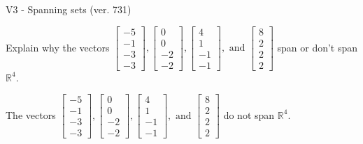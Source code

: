 \begin{exercise}
  \begin{exerciseTitle}V3 - Spanning sets (ver. 731)\end{exerciseTitle}
  \begin{exerciseStatement}
    Explain why the vectors \(\left[\begin{array}{r}
-5 \\
-1 \\
-3 \\
-3
\end{array}\right] , \left[\begin{array}{r}
0 \\
0 \\
-2 \\
-2
\end{array}\right] , \left[\begin{array}{r}
4 \\
1 \\
-1 \\
-1
\end{array}\right] , \text{ and } \left[\begin{array}{r}
8 \\
2 \\
2 \\
2
\end{array}\right]\) span or don't span \(\mathbb{R}^4\). 
	


  \end{exerciseStatement}
  \begin{exerciseAnswer}
   The vectors \(\left[\begin{array}{r}
-5 \\
-1 \\
-3 \\
-3
\end{array}\right] , \left[\begin{array}{r}
0 \\
0 \\
-2 \\
-2
\end{array}\right] , \left[\begin{array}{r}
4 \\
1 \\
-1 \\
-1
\end{array}\right] , \text{ and } \left[\begin{array}{r}
8 \\
2 \\
2 \\
2
\end{array}\right]\) 
  	 do not  
	span \(\mathbb{R}^4\).
  


  \end{exerciseAnswer}
\end{exercise}